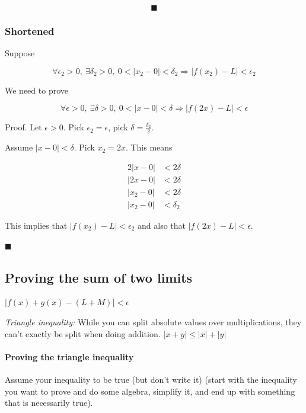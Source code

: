 \documentclass[12pt]{article}
\theoremstyle{plain}
\theoremstyle{remark}
\theoremstyle{definition}
\begin{document}
\[\blacksquare\]


\subsubsection{Shortened}

Suppose

\[\forall\epsilon_{2} > 0,\ \exists\delta_{2} > 0,\ 0 < \left| x_{2} - 0 \right| < \delta_{2} \Rightarrow \left| f\left( x_{2} \right) - L \right| < \epsilon_{2}\]

We need to prove

\[\forall\epsilon > 0,\ \exists\delta > 0,\ 0 < |x - 0| < \delta \Rightarrow \left| f(2x) - L \right| < \epsilon\]

Proof. Let \(\epsilon > 0\). Pick \(\epsilon_{2} = \epsilon\), pick
\(\delta = \frac{\delta_{2}}{2}\).

Assume \(|x - 0| < \delta\). Pick \(x_{2} = 2x\). This means

\begin{align*}
2|x - 0| &< 2\delta \\
|2x - 0| &< 2\delta \\
\left| x_{2} - 0 \right| &< 2\delta \\
\left| x_{2} - 0 \right| &< \delta_{2}
\end{align*}


This implies that
\(\left| f\left( x_{2} \right) - L \right| < \epsilon_{2}\) and also
that \(\left| f(2x) - L \right| < \epsilon\).

\(\blacksquare\)


\subsection{Proving the sum of two
limits}

\(\left| f(x) + g(x) - (L + M) \right| < \epsilon\)

\emph{Triangle inequality:} While you can split absolute values over
multiplications, they can't exactly be split when doing addition.
\(|x + y| \leq |x| + |y|\)


\paragraph{Proving the triangle
inequality}

Assume your inequality to be true (but don't write it) (start with the
inequality you want to prove and do some algebra, simplify it, and end
up with something that is necessarily true).
\end{document}
